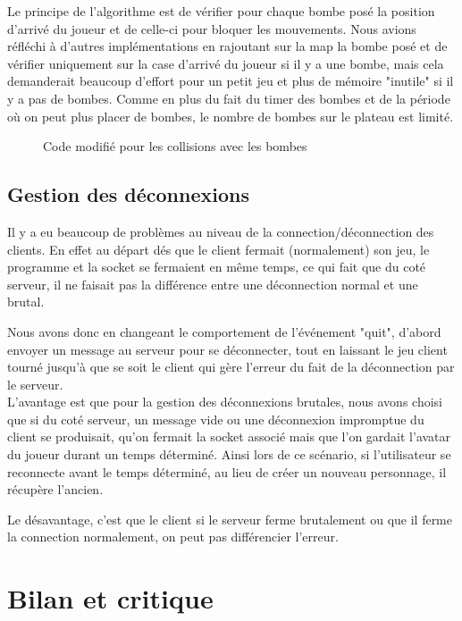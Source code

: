\documentclass[a4paper]{article}
\begin{document}
		Le principe de l'algorithme est de vérifier pour chaque bombe posé la position d'arrivé du joueur et de celle-ci pour bloquer les mouvements. Nous avions réfléchi à d'autres implémentations en rajoutant sur la map la bombe posé et de vérifier uniquement sur la case d'arrivé du joueur si il y a une bombe, mais cela demanderait beaucoup d'effort pour un petit jeu et plus de mémoire "inutile" si il y a pas de bombes. Comme en plus du fait du timer des bombes et de la période où on peut plus placer de bombes, le nombre de bombes sur le plateau est limité.
\newpage

\begin{figure}[!htbp]
	\centering
	
	\caption{Code modifié pour les collisions avec les bombes}
	\label{shema/codecolliders}
\end{figure}
		
\newpage
		\subsection{Gestion des déconnexions}
		
		Il y a eu beaucoup de problèmes au niveau de la connection/déconnection des clients. En effet au départ dés que le client fermait (normalement) son jeu, le programme et la socket se fermaient en même temps, ce qui fait que du coté serveur, il ne faisait pas la différence entre une déconnection normal et une brutal.
		
		Nous avons donc en changeant le comportement de l'événement "quit", d'abord envoyer un message au serveur pour se déconnecter, tout en laissant le jeu client tourné jusqu'à que se soit le client qui gère l'erreur du fait de la déconnection par le serveur.
		\\
		
		L'avantage est que pour la gestion des déconnexions brutales, nous avons choisi que si du coté serveur, un message vide ou une déconnexion impromptue du client se produisait, qu'on fermait la socket associé mais que l'on gardait l'avatar du joueur durant un temps déterminé. Ainsi lors de ce scénario, si l'utilisateur se reconnecte avant le temps déterminé, au lieu de créer un nouveau personnage, il récupère l'ancien.
		
		Le désavantage, c'est que le client si le serveur ferme brutalement ou que il ferme la connection normalement, on peut pas différencier l'erreur.
		

	\section{Bilan et critique}
	
\end{document}
